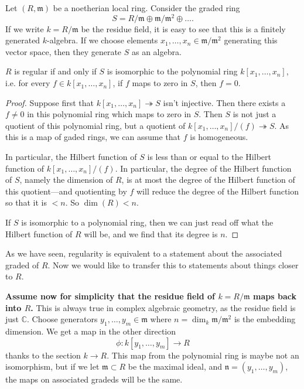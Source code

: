 Let $(R, \mathfrak{m})$ be a noetherian  local ring. Consider the graded ring
\[ S = R/\mathfrak{m} \oplus \mathfrak{m}/\mathfrak{m}^2 \oplus \dots.  \]
If we write $k = R/\mathfrak{m}$ be the residue field, it is easy to see that this is a finitely
generated $k$-algebra. If we choose elements $x_1, \dots, x_n \in
\mathfrak{m}/\mathfrak{m}^2$ generating this vector space, then they generate
$S$ as an algebra. 

\begin{proposition} 
$R$ is regular if and only if $S$ is isomorphic to the polynomial ring $k[x_1,
\dots, x_n]$, i.e. for every $f \in k[x_1, \dots, x_n]$, if $f$ maps to zero
in $S$, then $f=0$.
\end{proposition} 
\begin{proof} 
Suppose first that $k[x_1, \dots, x_n] \twoheadrightarrow S$ isn't injective.
Then there exists a $f \neq 0$ in this polynomial ring which maps to zero in
$S$. Then $S$ is not just a quotient of this polynomial ring, but a quotient of
$k[x_1, \dots, x_n]/(f) \twoheadrightarrow S$. As this is a map of gaded
rings, we can assume that $f$ is homogeneous. 

In particular, the Hilbert
function of $S$ is less than or equal to the Hilbert function of $k[x_1, \dots,
x_n]/(f)$. In particular, the degree of the Hilbert function of $S$, namely
the dimension of $R$, is at most
the degree of the Hilbert function of this quotient---and quotienting by $f$
will reduce the degree of the Hilbert function so that it is $<n$. So $\dim(R) <n$.

If $S$ is isomorphic to a polynomial ring, then we can just read off what the
Hilbert function of $R$ will be, and we find that its degree is $n$.
\end{proof} 

As we have seen, regularity is equivalent to a statement about the associated
graded of $R$. Now we would like to transfer this to statements about things
closer to $R$. 

\textbf{Assume now for simplicity that the residue field of $k=R/\mathfrak{m}$
maps back into $R$.} This is always true in complex algebraic geometry, as the
residue field is just $\mathbb{C}$. Choose generators $y_1, \dots, y_m \in
\mathfrak{m}$ where $n = \dim_k \mathfrak{m}/\mathfrak{m}^2$ is the embedding
dimension. We get a map in the other direction
\[ \phi:k[y_1, \dots, y_m] \to R  \]
thanks to the section $k \to R$. This map from the polynomial ring is maybe not
an isomorphism, but if we let $\mathfrak{m} \subset R$ be the maximal ideal,
and $\mathfrak{n} = (y_1, \dots, y_m)$, the maps on associated gradeds will be
the same.

